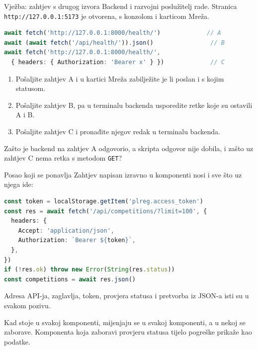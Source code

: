 \begin{frame}[fragile]{Vježba: zahtjev s drugog izvora}
Backend i razvojni poslužitelj rade. Stranica \texttt{http://127.0.0.1:5173} je otvorena, s konzolom i karticom Mreža.

\begin{lstlisting}[language=typescript]
await fetch('http://127.0.0.1:8000/health/')             // A
await (await fetch('/api/health/')).json()                // B
await fetch('http://127.0.0.1:8000/health/',
  { headers: { Authorization: 'Bearer x' } })             // C
\end{lstlisting}

\begin{enumerate}
  \itemsep0.15em
  \item Pošaljite zahtjev A i u kartici Mreža zabilježite je li poslan i s kojim statusom.
  \item Pošaljite zahtjev B, pa u terminalu backenda usporedite retke koje su ostavili A i B.
  \item Pošaljite zahtjev C i pronađite njegov redak u terminalu backenda.
\end{enumerate}

\vspace{0.2em}
Zašto je backend na zahtjev A odgovorio, a skripta odgovor nije dobila, i zašto uz zahtjev C nema retka s metodom \texttt{GET}?
\end{frame}


\begin{frame}[fragile]{Posao koji se ponavlja}
Zahtjev napisan izravno u komponenti nosi i sve što uz njega ide:

\begin{lstlisting}[language=typescript]
const token = localStorage.getItem('plreg.access_token')
const res = await fetch('/api/competitions/?limit=100', {
  headers: {
    Accept: 'application/json',
    Authorization: `Bearer ${token}`,
  },
})
if (!res.ok) throw new Error(String(res.status))
const competitions = await res.json()
\end{lstlisting}

\vspace{0.3em}
Adresa API-ja, zaglavlja, token, provjera statusa i pretvorba iz JSON-a isti su u svakom pozivu.

\vspace{0.3em}
Kad stoje u svakoj komponenti, mijenjaju se u svakoj komponenti, a u nekoj se zaborave. Komponenta koja zaboravi provjeru statusa tijelo pogreške prikaže kao podatke.
\end{frame}

